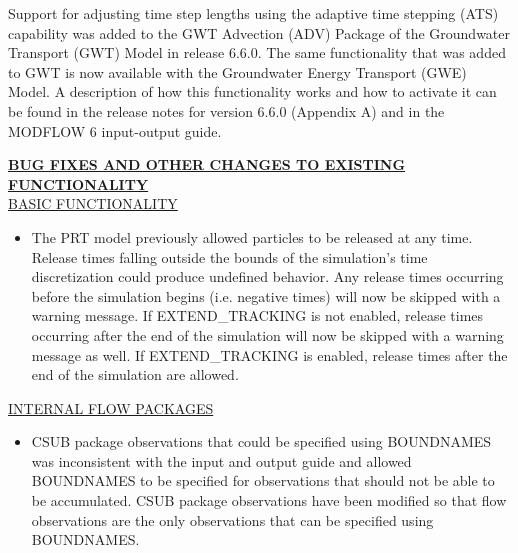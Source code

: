 	
\item \currentmodflowversion
	
	\item Support for adjusting time step lengths using the adaptive time stepping (ATS) capability was added to the GWT Advection (ADV) Package of the Groundwater Transport (GWT) Model in release 6.6.0.  The same functionality that was added to GWT is now available with the Groundwater Energy Transport (GWE) Model.  A description of how this functionality works and how to activate it can be found in the release notes for version 6.6.0 (Appendix A) and in the MODFLOW 6 input-output guide.


\textbf{\underline{BUG FIXES AND OTHER CHANGES TO EXISTING FUNCTIONALITY}} \\
\underline{BASIC FUNCTIONALITY}
\begin{itemize}
	\item The PRT model previously allowed particles to be released at any time. Release times falling outside the bounds of the simulation's time discretization could produce undefined behavior. Any release times occurring before the simulation begins (i.e. negative times) will now be skipped with a warning message. If EXTEND\_TRACKING is not enabled, release times occurring after the end of the simulation will now be skipped with a warning message as well. If EXTEND\_TRACKING is enabled, release times after the end of the simulation are allowed.
\end{itemize}

\underline{INTERNAL FLOW PACKAGES}
\begin{itemize}
	\item CSUB package observations that could be specified using BOUNDNAMES was inconsistent with the input and output guide and allowed BOUNDNAMES to be specified for observations that should not be able to be accumulated. CSUB package observations have been modified so that flow observations are the only observations that can be specified using BOUNDNAMES.
\end{itemize}

